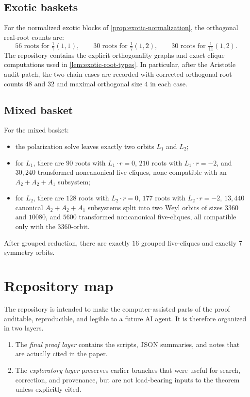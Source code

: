 \documentclass[11pt]{article}
\theoremstyle{definition}
\begin{document}
\subsection*{Exotic baskets}
For the normalized exotic blocks of \cref{prop:exotic-normalization}, the orthogonal real-root counts are:
\[
56 \text{ roots for } \tfrac17(1,1),
\qquad
30 \text{ roots for } \tfrac17(1,2),
\qquad
30 \text{ roots for } \tfrac1{11}(1,2).
\]
The repository contains the explicit orthogonality graphs and exact clique computations used in \cref{lem:exotic-root-types}. In particular, after the Aristotle audit patch, the two chain cases are recorded with corrected orthogonal root counts $48$ and $32$ and maximal orthogonal size $4$ in each case.

\subsection*{Mixed basket}
For the mixed basket:
\begin{itemize}
\item the polarization solve leaves exactly two orbits $L_1$ and $L_2$;
\item for $L_1$, there are $90$ roots with $L_1\cdot r=0$, $210$ roots with $L_1\cdot r=-2$, and $30{,}240$ transformed noncanonical five-cliques, none compatible with an $A_2+A_2+A_1$ subsystem;
\item for $L_2$, there are $128$ roots with $L_2\cdot r=0$, $177$ roots with $L_2\cdot r=-2$, $13{,}440$ canonical $A_2+A_2+A_1$ subsystems split into two Weyl orbits of sizes $3360$ and $10080$, and $5600$ transformed noncanonical five-cliques, all compatible only with the $3360$-orbit.
\end{itemize}
After grouped reduction, there are exactly $16$ grouped five-cliques and exactly $7$ symmetry orbits.

\section{Repository map}\label{app:repo}
The repository is intended to make the computer-assisted parts of the proof auditable, reproducible, and legible to a future AI agent. It is therefore organized in two layers.

\begin{enumerate}[label=\textup{(\roman*)}]
\item The \emph{final proof layer} contains the scripts, JSON summaries, and notes that are actually cited in the paper.
\item The \emph{exploratory layer} preserves earlier branches that were useful for search, correction, and provenance, but are not load-bearing inputs to the theorem unless explicitly cited.
\end{enumerate}
\end{document}
